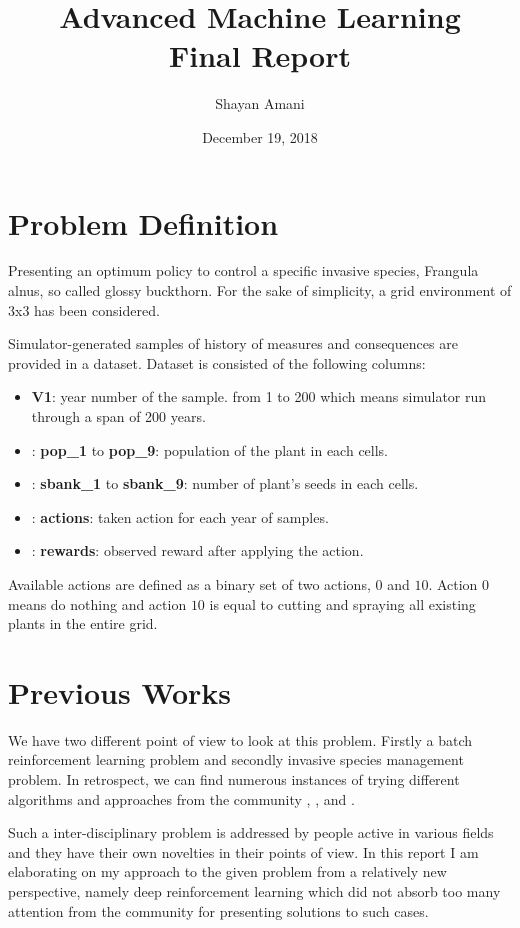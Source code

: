 \documentclass[12pt]{report}
\title{Advanced Machine Learning\\Final Report}
\author{Shayan Amani}
\date{December 19, 2018}
\begin{document}
\maketitle

\chapter{Problem Definition}
Presenting an optimum policy \cite{Sutton1998} to control a specific invasive species, Frangula alnus, so called glossy buckthorn. For the sake of simplicity, a grid environment of 3x3 has been considered. 

Simulator-generated samples of history of measures and consequences are provided in a dataset. Dataset is consisted of the following columns:
\begin{itemize}
    \item \textbf{V1}: year number of the sample. from 1 to 200 which means simulator run through a span of 200 years.
    \item: \textbf{pop\_1} to \textbf{pop\_9}: population of the plant in each cells.
    \item: \textbf{sbank\_1} to \textbf{sbank\_9}: number of plant's seeds in each cells.
    \item: \textbf{actions}: taken action for each year of samples.
    \item: \textbf{rewards}: observed reward after applying the action.
\end{itemize}

Available actions are defined as a binary set of two actions, $0$ and $10$. Action $0$ means do nothing and action $10$ is equal to cutting and spraying all existing plants in the entire grid.


\chapter{Previous Works}
We have two different point of view to look at this problem. Firstly a batch reinforcement learning problem and secondly invasive species management problem. In retrospect, we can find numerous instances of trying different algorithms and approaches from the community \cite{Phillips2006}, \cite{Phillips2004}, and \cite{Warton2010}.

Such a inter-disciplinary problem is addressed by people active in various fields and they have their own novelties in their points of view. In this report I am elaborating on my approach to the given problem from a relatively new perspective, namely deep reinforcement learning which did not absorb too many attention from the community for presenting solutions to such cases.
\end{document}
